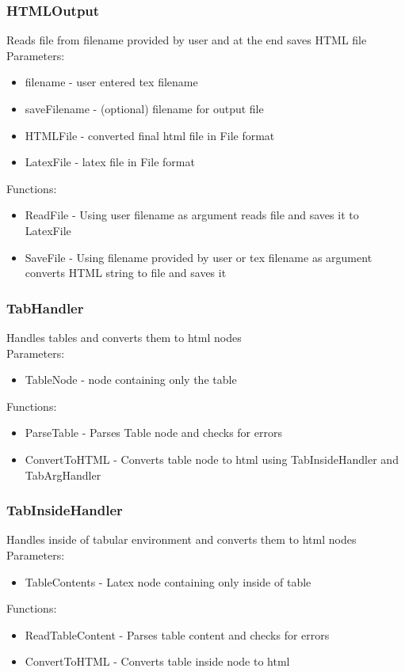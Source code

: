 \subsubsection{HTMLOutput}
Reads file from filename provided by user and at the end saves HTML file \\ 
Parameters: \\ 
\begin{itemize}
\item filename - user entered tex filename
\item saveFilename - (optional) filename for output file 
\item HTMLFile - converted final html file in File format 
\item LatexFile - latex file in File format 
\end{itemize}
Functions: 
\begin{itemize}
    \item ReadFile - Using user filename as argument reads file and saves it to LatexFile
    \item SaveFile - Using filename provided by user or tex filename as argument converts HTML string to file and saves it 
\end{itemize}

\subsubsection{TabHandler}
Handles tables and converts them to html nodes \\ 
Parameters: \\ 
\begin{itemize}
\item TableNode - node containing only the table
\end{itemize}
Functions: 
\begin{itemize}
    \item ParseTable - Parses Table node and checks for errors
    \item ConvertToHTML - Converts table node to html using TabInsideHandler and TabArgHandler
\end{itemize}

\subsubsection{TabInsideHandler}
Handles inside of tabular environment and converts them to html nodes  \\ 
Parameters: \\ 
\begin{itemize}
\item TableContents - Latex node containing only inside of table
\end{itemize}
Functions: 
\begin{itemize}
    \item ReadTableContent - Parses table content and checks for errors 
    \item ConvertToHTML - Converts table inside node to html
\end{itemize}

